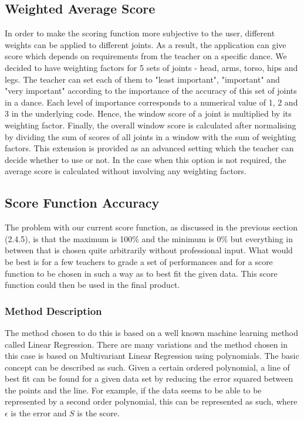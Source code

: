 \documentclass[10pt,a4paper]{article}
\begin{document}
\subsection{Weighted Average Score}
\noindent
In order to make the scoring function more subjective to the user, different weights can be applied to different joints. As a result, the application can give score which depends on requirements from the teacher on a specific dance. We decided to have weighting factors for 5 sets of joints - head, arms, torso, hips and legs. The teacher can set each of them to "least important", "important" and "very important" according to the importance of the accuracy of this set of joints in a dance. Each level of importance corresponds to a numerical value of 1, 2 and 3 in the underlying code. Hence, the window score of a joint is  multiplied by its weighting factor. Finally, the overall window score is calculated after  normalising by dividing the sum of scores of all joints in a window with the sum of weighting factors. This extension is provided as an advanced setting which the teacher can decide whether to use or not. In the case when this option is not required, the average score is calculated without involving any weighting factors. 

\subsection{Score Function Accuracy}
\noindent
The problem with our current score function, as discussed in the previous section (2.4.5), is that the maximum is 100\% and the minimum is 0\% but everything in between that is chosen quite arbitrarily without professional input. What would be best is for a few  teachers to grade a set of performances and for a score function to be chosen in such a way as to best fit the given data. This score function could then be used in the final product.
\subsubsection{Method Description}
\noindent
The method chosen to do this is based on a well known machine learning method called Linear Regression. There are many variations and the method chosen in this case is based on Multivariant Linear Regression using polynomials. The basic concept can be described as such. Given a certain ordered polynomial, a line of best fit can be found for a given data set by reducing the error squared between the points and the line. For example, if the data seems to be able to be represented by a second order polynomial, this can be represented as such, where $\epsilon$ is the error and $S$ is the score.
\end{document}
